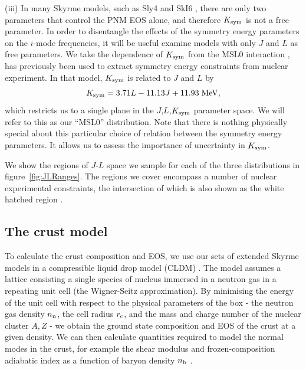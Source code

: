 \documentclass[fleqn,usenatbib]{mnras}
\begin{document}
(iii) In many Skyrme models, such as Sly4 \citep{chabanat1998skyrme} and SkI6 \citep{reinhard1995nuclear,nazarewicz1996structure}, there are only two parameters that control the PNM EOS alone, and therefore $K_{\rm sym}$ is not a free parameter. In order to disentangle the effects of the symmetry energy parameters on the $i$-mode frequencies, it will be useful examine models with only $J$ and $L$ as free parameters. We take the dependence of $K_{\rm sym}$ from the MSL0 interaction \citep{chen2009higher}, has previously been used to extract symmetry energy constraints from nuclear experiment. In that model, $K_{\rm sym}$ is related to $J$ and $L$ by \citep{newton2020nuclear}
\begin{align}
K_{\rm sym}=3.71L-11.13J+11.93\; \rm{MeV},
\end{align}
\noindent which restricts us to a single plane in the $J$,$L$,$K_{\rm sym}$ parameter space. We will refer to this as our ``MSL0'' distribution. Note that there is nothing physically special about this particular choice of relation between the symmetry energy parameters.
It allows us to assess the importance of uncertainty in $K_{\rm sym}$.

We show the regions of $J$-$L$ space we sample for each of the three distributions in figure~\ref{fig:JLRanges}. The regions we cover encompass a number of nuclear experimental constraints, the intersection of which is also shown as the white hatched region \cite{lattimer2013constraining}.  

\subsection{The crust model}

To calculate the crust composition and EOS, we use our sets of extended Skyrme models in a compressible liquid drop model (CLDM) \citep{Newton:2013aa,Balliet:2020aa}. The model assumes a lattice consisting a single species of nucleus immersed in a neutron gas in a repeating unit cell (the Wigner-Seitz approximation). By minimising the energy of the unit cell with respect to the physical parameters of the box - the neutron gas density $n_{\rm n}$, the cell radius $r_{\rm c}$, and the mass and charge number of the nuclear cluster $A,Z$ - we obtain the ground state composition and EOS of the crust at a given density. We can then calculate quantities required to model the normal modes in the crust, for example the shear modulus and frozen-composition adiabatic index as a function of baryon density $n_{\rm b}$ \citep{strohmayer1991shear,Chugunov:2010aa}. 
\end{document}

